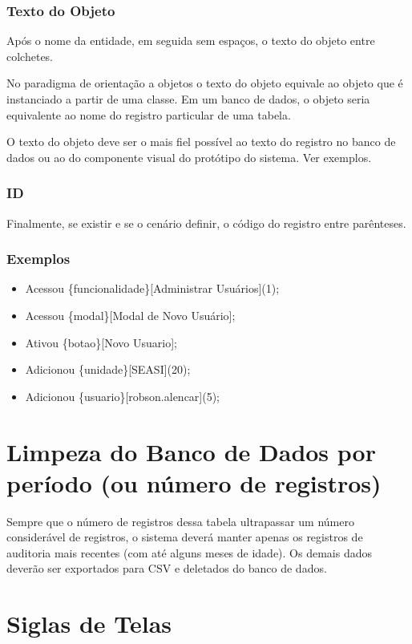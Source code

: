 \subsubsection{Texto do Objeto}
	Após o nome da entidade, em seguida sem espaços, o texto do objeto entre colchetes. 
	
	No paradigma de orientação a objetos o texto do objeto equivale ao objeto que é instanciado a partir de uma classe. Em um banco de dados, o objeto seria equivalente ao nome do registro particular de uma tabela. 
	
	O texto do objeto deve ser o mais fiel possível ao texto do registro no banco de dados ou ao do componente visual do protótipo do sistema. Ver exemplos.
	
\subsubsection{ID}
	 Finalmente, se existir e se o cenário definir, o código do registro entre parênteses. 

\subsubsection{Exemplos}

	\begin{itemize}
		\item Acessou \{funcionalidade\}[Administrar Usuários](1);	
		\item Acessou \{modal\}[Modal de Novo Usuário];	
		\item Ativou \{botao\}[Novo Usuario];	
		\item Adicionou \{unidade\}[SEASI](20);	
		\item Adicionou \{usuario\}[robson.alencar](5);	
	\end{itemize}



\section{Limpeza do Banco de Dados por período (ou número de registros)}

Sempre que o número de registros dessa tabela ultrapassar um número considerável de registros, o sistema deverá manter apenas os registros de auditoria mais recentes  (com até alguns meses de idade). Os demais dados deverão ser exportados para CSV e deletados do banco de dados.


\section{Siglas de Telas}


